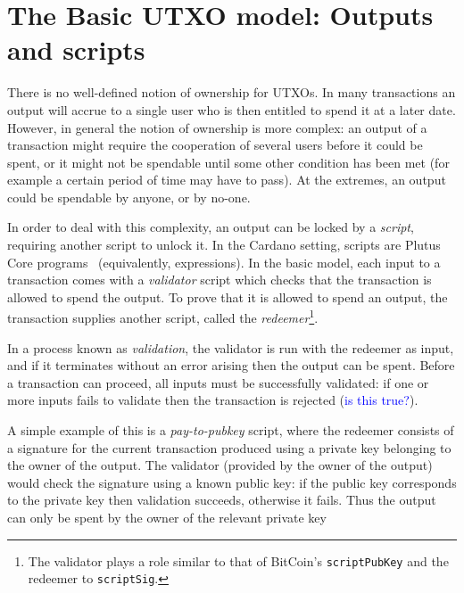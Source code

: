 \documentclass[a4paper]{article}
\newcommand{\blue}[1]{\textcolor{blue}{#1}}
\renewcommand{\i}{\textit}  %
\theoremstyle{definition}  %
\begin{document}
\section{The Basic UTXO model: Outputs and scripts}
\label{sec:utxo-intro}

There is no well-defined notion of ownership for UTXOs.  In many
transactions an output will accrue to a single user who is then
entitled to spend it at a later date.  However, in general the notion
of ownership is more complex: an output of a transaction might require
the cooperation of several users before it could be spent, or it might
not be spendable until some other condition has been met (for example
a certain period of time may have to pass).  At the extremes, an
output could be spendable by anyone, or by no-one.

In order to deal with this complexity, an output can be locked by a
\textit{script}, requiring another script to unlock it.  In the
Cardano setting, scripts are Plutus Core
programs~\cite{Plutus-Core-spec} (equivalently, expressions).  In the
basic model, each input to a transaction comes with a \i{validator}
script which checks that the transaction is allowed to spend the
output. To prove that it is allowed to spend an output, the
transaction supplies another script, called the \i{redeemer}\footnote{
  The validator plays a role similar to that of BitCoin's
  \texttt{scriptPubKey} and the redeemer to \texttt{scriptSig}.}.

In a process known as \i{validation}, the validator is run with the
redeemer as input, and if it terminates without an error arising then
the output can be spent.  Before a transaction can proceed, all inputs
must be successfully validated: if one or more inputs fails to validate
then the transaction is rejected (\blue{is this true?}).

A simple example of this is a \i{pay-to-pubkey} script, where the
redeemer consists of a signature for the current transaction produced
using a private key belonging to the owner of the output.  The
validator (provided by the owner of the output) would check the
signature using a known public key: if the public key corresponds to
the private key then validation succeeds, otherwise it fails.  Thus
the output can only be spent by the owner of the relevant private key
\end{document}
